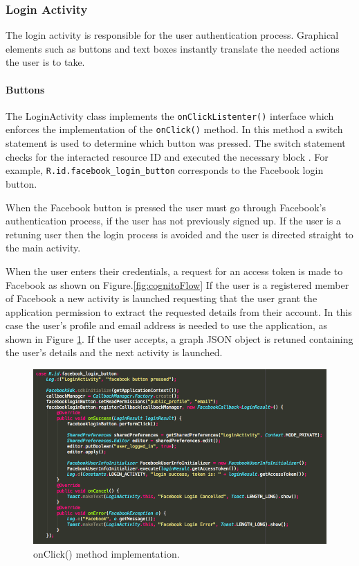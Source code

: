 \documentclass[a4paper, 11pt]{article}
\begin{document}
\subsubsection{Login Activity}
The login activity is responsible for the user authentication process. Graphical elements such as buttons and text boxes instantly translate the needed actions the user is to take. 

\paragraph{Buttons}
The LoginActivity class implements the \texttt{onClickListenter()} interface which enforces the implementation of the \texttt{onClick()} method. In this method a switch statement is used to determine which button was pressed. The switch statement checks for the interacted resource ID and executed the necessary block . For example, \texttt{R.id.facebook\_login\_button} corresponds to the Facebook login button. 

When the Facebook button is pressed the  user must go through Facebook's authentication process, if the user has not previously signed up. If the user is a retuning user then the login process is avoided and the user is directed straight to the main activity.  

When the user enters their credentials, a request for an access token is made to Facebook as shown on Figure.\ref{fig:cognitoFlow} If the user is a registered member of Facebook a new activity is launched requesting that the user grant the application permission to extract the requested details from their account. In this case the user's profile and email address is needed to use the application, as shown in Figure \ref{fig:onClick}. If the user accepts, a graph JSON object is retuned containing the user's details and the next activity is launched.

\vspace{\baselineskip}

\begin{figure}[h]
\centering
\includegraphics[width=\textwidth]{fbProfileEmail}
\caption{onClick() method implementation.} \label{fig:onClick}
\end{figure}
\end{document}
